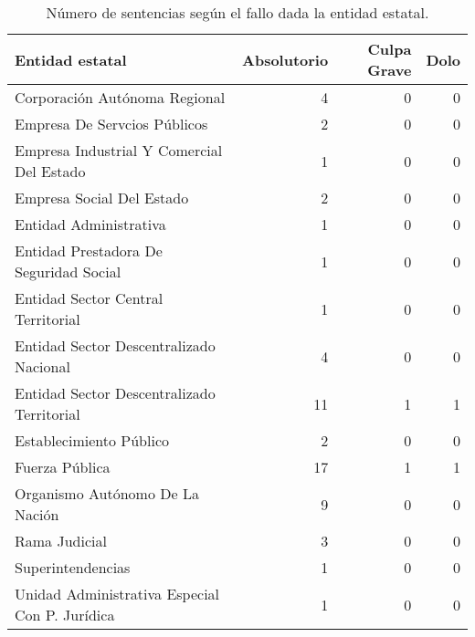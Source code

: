 \begin{table}[!htbp]
\centering
\caption{Número de sentencias según el fallo dada la entidad estatal.} 
\label{tab:entidadfallo}
\begin{tabular}{lrrr}
  \hline
Entidad estatal & Absolutorio & Culpa Grave & Dolo \\ 
  \hline
Corporación Autónoma Regional &  4 &  0 &  0 \\ 
  Empresa De Servcios Públicos &  2 &  0 &  0 \\ 
  Empresa Industrial Y Comercial Del Estado &  1 &  0 &  0 \\ 
  Empresa Social Del Estado &  2 &  0 &  0 \\ 
  Entidad Administrativa &  1 &  0 &  0 \\ 
  Entidad Prestadora De Seguridad Social &  1 &  0 &  0 \\ 
  Entidad Sector Central Territorial &  1 &  0 &  0 \\ 
  Entidad Sector Descentralizado Nacional &  4 &  0 &  0 \\ 
  Entidad Sector Descentralizado Territorial & 11 &  1 &  1 \\ 
  Establecimiento Público &  2 &  0 &  0 \\ 
  Fuerza Pública & 17 &  1 &  1 \\ 
  Organismo Autónomo De La Nación &  9 &  0 &  0 \\ 
  Rama Judicial &  3 &  0 &  0 \\ 
  Superintendencias &  1 &  0 &  0 \\ 
  Unidad Administrativa Especial Con P. Jurídica &  1 &  0 &  0 \\ 
   \hline
\end{tabular}
\end{table}
